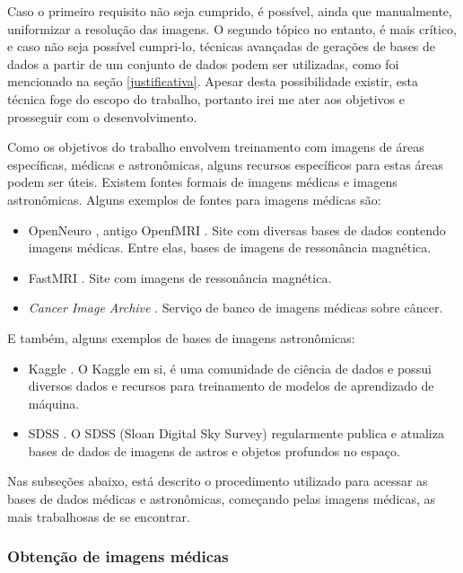 Caso o primeiro requisito não seja cumprido, é possível, ainda que manualmente, uniformizar a resolução das imagens. O segundo tópico no entanto, é mais crítico, e caso não seja possível cumpri-lo, técnicas avançadas de gerações de bases de dados a partir de um conjunto de dados podem ser utilizadas, como foi mencionado na seção \ref{justificativa}. Apesar desta possibilidade existir, esta técnica foge do escopo do trabalho, portanto irei me ater aos objetivos e prosseguir com o desenvolvimento.

Como os objetivos do trabalho envolvem treinamento com imagens de áreas específicas, médicas e astronômicas, alguns recursos específicos para estas áreas podem ser úteis. Existem fontes formais de imagens médicas e imagens astronômicas. Alguns exemplos de fontes para imagens médicas são:

\begin{itemize}
    \item OpenNeuro \cite{openneuro_openneuro_2022}, antigo OpenfMRI \cite{openfmri_openfmri_2022}. Site com diversas bases de dados contendo imagens médicas. Entre elas, bases de imagens de ressonância magnética.
    \item FastMRI \cite{fastmri_fastmri_2022}. Site com imagens de ressonância magnética.
    \item \textit{Cancer Image Archive} \cite{cancer_imaging_archive_cancer_2022}. Serviço de banco de imagens médicas sobre câncer.
\end{itemize}

E também, alguns exemplos de bases de imagens astronômicas:

\begin{itemize}
    \item Kaggle \cite{srivastava_astronomy_2024}. O Kaggle em si, é uma comunidade de ciência de dados e possui diversos dados e recursos para treinamento de modelos de aprendizado de máquina. 
    \item SDSS \cite{sdss_sloan_2024}. O SDSS (Sloan Digital Sky Survey) regularmente publica e atualiza bases de dados de imagens de astros e objetos profundos no espaço.
\end{itemize}

Nas subseções abaixo, está descrito o procedimento utilizado para acessar as bases de dados médicas e astronômicas, começando pelas imagens médicas, as mais trabalhosas de se encontrar.

\subsubsection{Obtenção de imagens médicas}
\label{sec:imagens_medicas}

